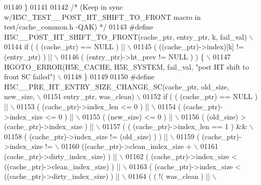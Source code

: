 \begin{DoxyCode}
01140 \textcolor{preprocessor}{\}}
01141 
01142 \textcolor{comment}{/* (Keep in sync w/H5C\_TEST\_\_POST\_HT\_SHIFT\_TO\_FRONT macro in test/cache\_common.h -QAK) */}
01143 \textcolor{preprocessor}{#define H5C\_\_POST\_HT\_SHIFT\_TO\_FRONT(cache\_ptr, entry\_ptr, k, fail\_val) \(\backslash\)}
01144 \textcolor{preprocessor}{if ( ( (cache\_ptr) == NULL ) ||                                        \(\backslash\)}
01145 \textcolor{preprocessor}{     ( ((cache\_ptr)->index)[k] != (entry\_ptr) ) ||                     \(\backslash\)}
01146 \textcolor{preprocessor}{     ( (entry\_ptr)->ht\_prev != NULL ) ) \{                              \(\backslash\)}
01147 \textcolor{preprocessor}{    HGOTO\_ERROR(H5E\_CACHE, H5E\_SYSTEM, fail\_val, "post HT shift to front SC failed") \(\backslash\)}
01148 \textcolor{preprocessor}{\}}
01149 
01150 \textcolor{preprocessor}{#define H5C\_\_PRE\_HT\_ENTRY\_SIZE\_CHANGE\_SC(cache\_ptr, old\_size, new\_size, \(\backslash\)}
01151 \textcolor{preprocessor}{                                 entry\_ptr, was\_clean)          \(\backslash\)}
01152 \textcolor{preprocessor}{if ( ( (cache\_ptr) == NULL ) ||                                         \(\backslash\)}
01153 \textcolor{preprocessor}{     ( (cache\_ptr)->index\_len <= 0 ) ||                                 \(\backslash\)}
01154 \textcolor{preprocessor}{     ( (cache\_ptr)->index\_size <= 0 ) ||                                \(\backslash\)}
01155 \textcolor{preprocessor}{     ( (new\_size) <= 0 ) ||                                             \(\backslash\)}
01156 \textcolor{preprocessor}{     ( (old\_size) > (cache\_ptr)->index\_size ) ||                        \(\backslash\)}
01157 \textcolor{preprocessor}{     ( ( (cache\_ptr)->index\_len == 1 ) &&                               \(\backslash\)}
01158 \textcolor{preprocessor}{       ( (cache\_ptr)->index\_size != (old\_size) ) ) ||                   \(\backslash\)}
01159 \textcolor{preprocessor}{     ( (cache\_ptr)->index\_size !=                                       \(\backslash\)}
01160 \textcolor{preprocessor}{       ((cache\_ptr)->clean\_index\_size +                                 \(\backslash\)}
01161 \textcolor{preprocessor}{        (cache\_ptr)->dirty\_index\_size) ) ||                             \(\backslash\)}
01162 \textcolor{preprocessor}{     ( (cache\_ptr)->index\_size < ((cache\_ptr)->clean\_index\_size) ) ||   \(\backslash\)}
01163 \textcolor{preprocessor}{     ( (cache\_ptr)->index\_size < ((cache\_ptr)->dirty\_index\_size) ) ||   \(\backslash\)}
01164 \textcolor{preprocessor}{     ( ( !( was\_clean ) ||                                              \(\backslash\)}

\end{DoxyCode}
